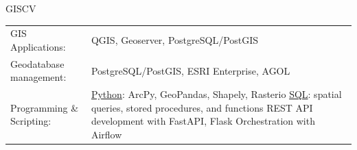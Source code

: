 \documentclass[letterpaper]{article}
\newenvironment{skillslist}
        {
            \hspace*{-0.07in}\begin{tabular}[t]{ l L{5.17in} }
        }{
            \end{tabular}
        }
\newcommand{\impt}[1]{\uline{#1}}
\begin{document}
    \begin{taggedblock}{GISCV}
        \begin{skillslist}
            GIS Applications:&
                QGIS, Geoserver, PostgreSQL/PostGIS \linebreak
                \\
            Geodatabase management:&
                PostgreSQL/PostGIS, ESRI Enterprise, AGOL \linebreak
                \\
            Programming \& Scripting:&
                \impt{Python}: ArcPy, GeoPandas, Shapely, Rasterio \linebreak
                \impt{SQL}: spatial queries, stored procedures, and functions \linebreak
                REST API development with FastAPI, Flask \linebreak
                Orchestration with Airflow \linebreak

\end{skillslist}
\end{taggedblock}
\end{document}
